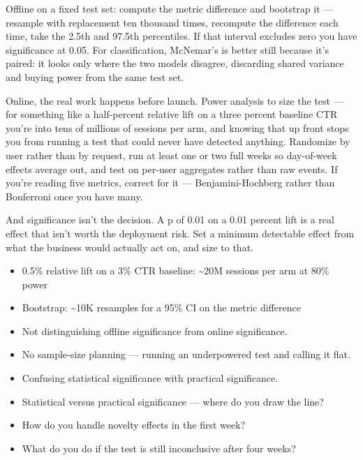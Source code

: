 \documentclass[10pt,twoside]{book}
\newcommand{\lab}[1]{\par\vspace{5pt}\noindent{\sffamily\footnotesize\bfseries\color{accent}#1}\par\vspace{1pt}}
\newcommand{\flab}[1]{\par\vspace{5pt}\noindent{\sffamily\footnotesize\bfseries\color{flag}#1}\par\vspace{1pt}}
\begin{document}
Offline on a fixed test set: compute the metric difference and bootstrap it --- resample with replacement ten thousand times, recompute the difference each time, take the 2.5th and 97.5th percentiles. If that interval excludes zero you have significance at 0.05. For classification, McNemar's is better still because it's paired: it looks only where the two models disagree, discarding shared variance and buying power from the same test set.\par\vspace{3pt}
Online, the real work happens before launch. Power analysis to size the test --- for something like a half-percent relative lift on a three percent baseline CTR you're into tens of millions of sessions per arm, and knowing that up front stops you from running a test that could never have detected anything. Randomize by user rather than by request, run at least one or two full weeks so day-of-week effects average out, and test on per-user aggregates rather than raw events. If you're reading five metrics, correct for it --- Benjamini-Hochberg rather than Bonferroni once you have many.\par\vspace{3pt}
And significance isn't the decision. A p of 0.01 on a 0.01 percent lift is a real effect that isn't worth the deployment risk. Set a minimum detectable effect from what the business would actually act on, and size to that.\par\vspace{3pt}
\lab{Numbers}
\begin{itemize}
\item 0.5\% relative lift on a 3\% CTR baseline: \textasciitilde{}20M sessions per arm at 80\% power
\item Bootstrap: \textasciitilde{}10K resamples for a 95\% CI on the metric difference
\end{itemize}
\flab{Loses the signal}
\begin{itemize}
\item Not distinguishing offline significance from online significance.
\item No sample-size planning --- running an underpowered test and calling it flat.
\item Confusing statistical significance with practical significance.
\end{itemize}
\lab{Then they ask}
\begin{itemize}
\item Statistical versus practical significance --- where do you draw the line?
\item How do you handle novelty effects in the first week?
\item What do you do if the test is still inconclusive after four weeks?
\end{itemize}
\end{document}
